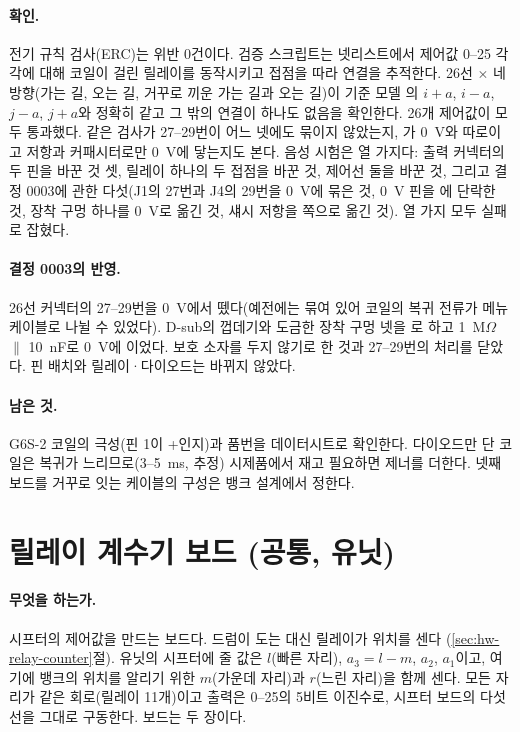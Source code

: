 \paragraph{확인.} 전기 규칙 검사(ERC)는 위반 0건이다. 검증 스크립트는 넷리스트에서 제어값 0--25 각각에 대해
코일이 걸린 릴레이를 동작시키고 접점을 따라 연결을 추적한다. 26선 $\times$ 네 방향(가는 길, 오는 길, 거꾸로
끼운 가는 길과 오는 길)이 기준 모델 의 $i+a$, $i-a$, $j-a$, $j+a$와 정확히 같고 그 밖의 연결이
하나도 없음을 확인한다. 26개 제어값이 모두 통과했다. 같은 검사가 27--29번이 어느 넷에도 묶이지 않았는지,
가 0~V와 따로이고 저항과 커패시터로만 0~V에 닿는지도 본다. 음성 시험은 열 가지다: 출력 커넥터의
두 핀을 바꾼 것 셋, 릴레이 하나의 두 접점을 바꾼 것, 제어선 둘을 바꾼 것, 그리고 결정 0003에 관한 다섯(J1의
27번과 J4의 29번을 0~V에 묶은 것, 0~V 핀을 에 단락한 것, 장착 구멍 하나를 0~V로 옮긴 것, 섀시
저항을  쪽으로 옮긴 것). 열 가지 모두 실패로 잡혔다.

\paragraph{결정 0003의 반영.} 26선 커넥터의 27--29번을 0~V에서 뗐다(예전에는 묶여 있어 코일의 복귀 전류가 메뉴
케이블로 나뉠 수 있었다). D-sub의 껍데기와 도금한 장착 구멍 넷을 로 하고 1~M$\Omega$ $\parallel$
10~nF로 0~V에 이었다. 보호 소자를 두지 않기로 한 것과 27--29번의 처리를 닫았다. 핀 배치와 릴레이·다이오드는
바뀌지 않았다.

\paragraph{남은 것.} G6S-2 코일의 극성(핀 1이 +인지)과 품번을 데이터시트로 확인한다. 다이오드만 단 코일은 복귀가
느리므로(3--5~ms, 추정) 시제품에서 재고 필요하면 제너를 더한다. 넷째 보드를 거꾸로 잇는 케이블의 구성은 뱅크
설계에서 정한다.


\section{릴레이 계수기 보드 (공통, 유닛)}\label{sch:counter-common}

\paragraph{무엇을 하는가.} 시프터의 제어값을 만드는 보드다. 드럼이 도는 대신 릴레이가 위치를 센다
(\ref{sec:hw-relay-counter}절). 유닛의 시프터에 줄 값은 $l$(빠른 자리), $a_3 = l - m$, $a_2$, $a_1$이고, 여기에 뱅크의
위치를 알리기 위한 $m$(가운데 자리)과 $r$(느린 자리)을 함께 센다. 모든 자리가 같은 회로(릴레이 11개)이고 출력은
0--25의 5비트 이진수로, 시프터 보드의  다섯 선을 그대로 구동한다. 보드는 두 장이다.

